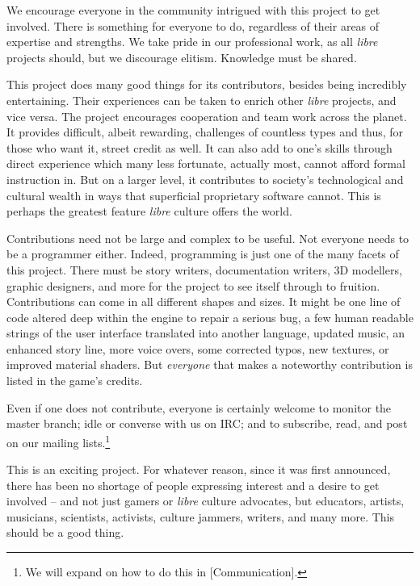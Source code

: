 
We encourage everyone in the community intrigued with this project to get involved. There is something for everyone to do, regardless of their areas of expertise and strengths. We take pride in our professional work, as all {\it libre} projects should, but we discourage elitism. Knowledge must be shared.

This project does many good things for its contributors, besides being incredibly entertaining. Their experiences can be taken to enrich other {\it libre} projects, and vice versa. The project encourages cooperation and team work across the planet. It provides difficult, albeit rewarding, challenges of countless types and thus, for those who want it, street credit as well. It can also add to one's skills through direct experience which many less fortunate, actually most, cannot afford formal instruction in. But on a larger level, it contributes to society's technological and cultural wealth in ways that superficial proprietary software cannot. This is perhaps the greatest feature {\it libre} culture offers the world.

Contributions need not be large and complex to be useful. Not everyone needs to be a programmer either. Indeed, programming is just one of the many facets of this project. There must be story writers, documentation writers, 3D modellers, graphic designers, and more for the project to see itself through to fruition. Contributions can come in all different shapes and sizes. It might be one line of code altered deep within the engine to repair a serious bug, a few human readable strings of the user interface translated into another language, updated music, an enhanced story line, more voice overs, some corrected typos, new textures, or improved material shaders. But {\it everyone} that makes a noteworthy contribution is listed in the game's credits.

Even if one does not contribute, everyone is certainly welcome to monitor the master branch; idle or converse with us on IRC; and to subscribe, read, and post on our mailing lists.\footnote{We will expand on how to do this in [Communication].}

This is an exciting project. For whatever reason, since it was first announced, there has been no shortage of people expressing interest and a desire to get involved -- and not just gamers or {\it libre} culture advocates, but educators, artists, musicians, scientists, activists, culture jammers, writers, and many more. This should be a good thing. 

